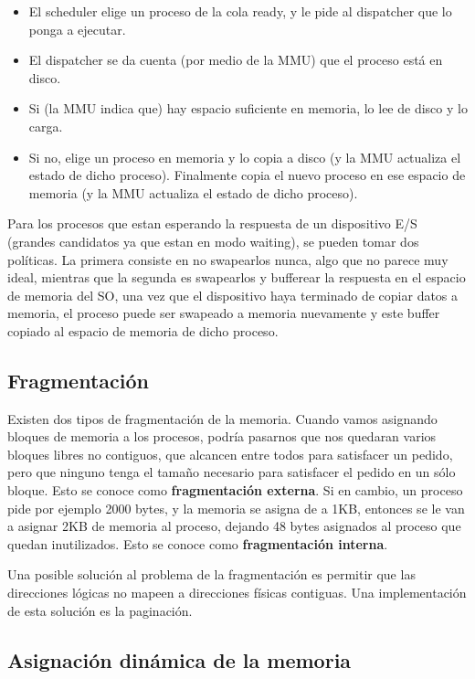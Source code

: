 \documentclass{article}
\begin{document}
\begin{itemize}
 \item El scheduler elige un proceso de la cola ready, y le pide al dispatcher que lo ponga a ejecutar.
 \item El dispatcher se da cuenta (por medio de la MMU) que el proceso está en disco.
 \item Si (la MMU indica que) hay espacio suficiente en memoria, lo lee de disco y lo carga.
 \item Si no, elige un proceso en memoria y lo copia a disco (y la MMU actualiza el estado de dicho proceso). Finalmente copia el nuevo proceso en ese espacio de memoria (y la MMU actualiza el estado de dicho proceso).
\end{itemize}

Para los procesos que estan esperando la respuesta de un dispositivo E/S (grandes candidatos ya que estan en modo waiting), se pueden tomar dos políticas. La primera consiste en no swapearlos nunca, algo que no parece muy ideal, mientras que la segunda es swapearlos y bufferear la respuesta en el espacio de memoria del SO, una vez que el dispositivo haya terminado de copiar datos a memoria, el proceso puede ser swapeado a memoria nuevamente y este buffer copiado al espacio de memoria de dicho proceso.

\subsection{Fragmentaci\'on}

Existen dos tipos de fragmentaci\'on de la memoria. Cuando vamos asignando bloques de memoria a los procesos, podr\'ia pasarnos que nos quedaran varios bloques libres no contiguos, que alcancen entre todos para satisfacer un pedido, pero que ninguno tenga el tama\~no necesario para satisfacer el pedido en un s\'olo bloque. Esto se conoce como \textbf{fragmentaci\'on externa}. Si en cambio, un proceso pide por ejemplo 2000 bytes, y la memoria se asigna de a 1KB, entonces se le van a asignar 2KB de memoria al proceso, dejando 48 bytes asignados al proceso que quedan inutilizados. Esto se conoce como \textbf{fragmentaci\'on interna}.

Una posible soluci\'on al problema de la fragmentaci\'on es permitir que las direcciones l\'ogicas no mapeen a direcciones f\'isicas contiguas. Una implementaci\'on de esta soluci\'on es la paginaci\'on.

\subsection{Asignaci\'on din\'amica de la memoria}
\end{document}
